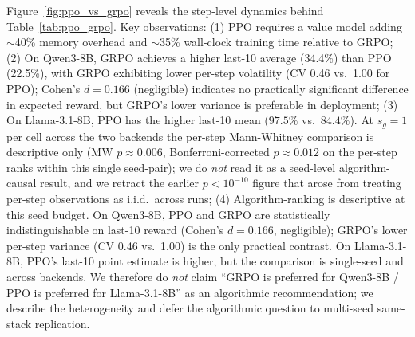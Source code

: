 \documentclass{article}
\begin{document}
Figure~\ref{fig:ppo_vs_grpo} reveals the step-level dynamics behind Table~\ref{tab:ppo_grpo}.
Key observations:
(1) PPO requires a value model adding $\sim$40\% memory overhead and
$\sim$35\% wall-clock training time relative to GRPO;
(2) On Qwen3-8B, GRPO achieves a higher last-10 average (34.4\%) than PPO (22.5\%),
with GRPO exhibiting lower per-step volatility (CV 0.46 vs.~1.00 for PPO);
Cohen's $d = 0.166$ (negligible) indicates no practically significant difference
in expected reward, but GRPO's lower variance is preferable in deployment;
(3) On Llama-3.1-8B, PPO has the higher last-10 mean ($97.5\%$ vs.\
$84.4\%$). At $s_g{=}1$ per cell across the two backends the
per-step Mann-Whitney comparison is descriptive only
(MW $p \approx 0.006$, Bonferroni-corrected $p \approx 0.012$ on the
per-step ranks within this single seed-pair); we do \emph{not} read it
as a seed-level algorithm-causal result, and we retract the
earlier $p < 10^{-10}$ figure that arose from treating per-step
observations as i.i.d.\ across runs;
(4) Algorithm-ranking is descriptive at this seed budget. On Qwen3-8B,
PPO and GRPO are statistically indistinguishable on last-10 reward
(Cohen's $d = 0.166$, negligible); GRPO's lower per-step variance
(CV 0.46 vs.\ 1.00) is the only practical contrast. On Llama-3.1-8B,
PPO's last-10 point estimate is higher, but the comparison is
single-seed and across backends. We therefore do \emph{not} claim
``GRPO is preferred for Qwen3-8B / PPO is preferred for Llama-3.1-8B''
as an algorithmic recommendation; we describe the heterogeneity and
defer the algorithmic question to multi-seed same-stack replication.
\end{document}
